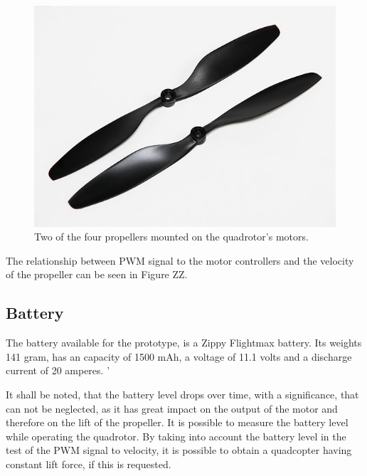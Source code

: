 \begin{figure}[H]
	\centering
	\includegraphics[scale=0.4]{figures/propeller.png}
	\caption{Two of the four propellers mounted on the quadrotor's motors.}
	\label{fig:Propeller}
\end{figure}

The relationship between PWM signal to the motor controllers and the velocity of the propeller can be seen in Figure ZZ. 


 
\subsection{Battery}
The battery available for the prototype, is a Zippy Flightmax battery. Its weights 141 gram, has an capacity of 1500 mAh, a voltage of 11.1 volts and a discharge current of 20 amperes. '

It shall be noted, that the battery level drops over time, with a significance, that can not be neglected, as it has great impact on the output of the motor and therefore on the lift of the propeller. It is possible to measure the battery level while operating the quadrotor. By taking into account the battery level in the test of the PWM signal to velocity, it is possible to obtain a quadcopter having constant lift force, if this is requested.

